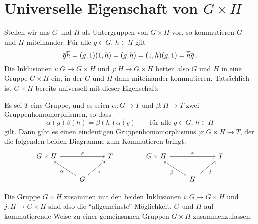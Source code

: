 \section{Universelle Eigenschaft von \texorpdfstring{$G \times H$}{G x H}}

Stellen wir uns $G$ und $H$ als Untergruppen von $G \times H$ vor, so kommutieren $G$ und $H$ miteinander:
Für alle $g \in G$, $h \in H$ gilt
\[
    \overline{g} \overline{h}
  = (g, 1) (1, h)
  = (g, h)
  = (1, h) (g, 1)
  = \overline{h} \overline{g} \,.
\]
Die Inklusionen $i \colon G \to G \times H$ und $j \colon H \to G \times H$ betten also $G$ und $H$ in eine Gruppe $G \times H$ ein, in der $G$ und $H$ dann miteinander kommutieren.
Tatsächlich ist $G \times H$ bereits universell mit dieser Eigenschaft:

\begin{proposition}
  Es sei $T$ eine Gruppe, und es seien $\alpha \colon G \to T$ und $\beta \colon H \to T$ zwei Gruppenhomomorphismen, so dass
  \[
      \alpha(g) \beta(h)
    = \beta(h) \alpha(g)
    \qquad
    \text{für alle $g \in G$, $h \in H$}
  \]
  gilt.
  Dann gibt es einen eindeutigen Gruppenhomomorphismus $\varphi \colon G \times H \to T$, der die folgenden beiden Diagramme zum Kommutieren bringt:
  \[
    \begin{tikzcd}
        G \times H
        \arrow{rr}{\varphi}
      & {}
      & T
      \\
        {}
      & G
        \arrow[swap]{ru}{i}
        \arrow{lu}{\alpha}
      & {}
    \end{tikzcd}
    \qquad\qquad
    \begin{tikzcd}
        G \times H
        \arrow{rr}{\varphi}
      & {}
      & T
      \\
        {}
      & H
        \arrow[swap]{ru}{j}
        \arrow{lu}{\beta}
      & {}
    \end{tikzcd}
  \]
\end{proposition}

Die Gruppe $G \times H$ zusammen mit den beiden Inklusionen $i \colon G \to G \times H$ und $j \colon H \to G \times H$ sind also die \enquote{allgemeinste} Möglichkeit, $G$ und $H$ auf kommutierende Weise zu einer gemeinsamen Gruppen $G \times H$ zusammenzufassen.
